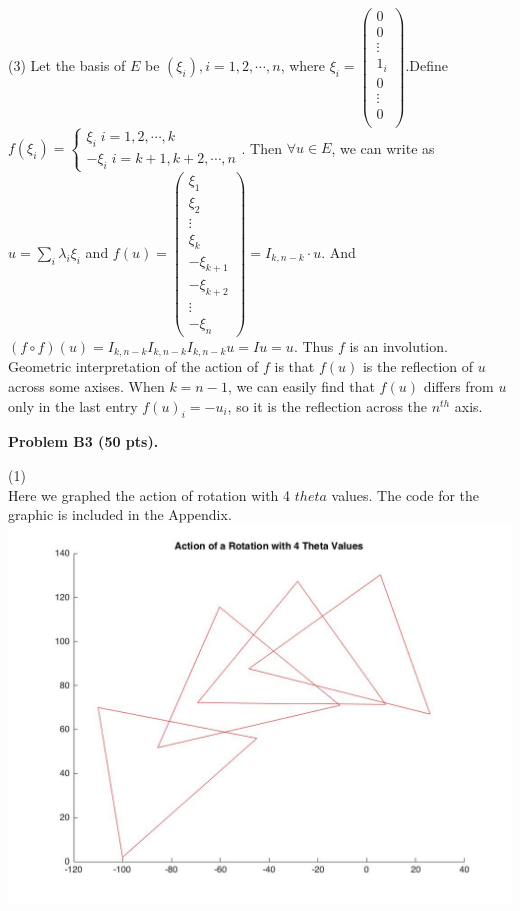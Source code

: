 \documentclass[12pt]{article}
\begin{document}
\medskip
(3)
Let the basis of $E$ be $(\xi_i), i = 1, 2, \cdots, n$, where $\xi_i = 
\begin{pmatrix}
0 \\
0 \\
\vdots \\
1_i \\
0 \\
\vdots \\
0 \\
\end{pmatrix}
$.Define \\
$
f(\xi_i) = \left \{
				\begin{array}{ll}
				\xi_i \; i = 1,2,\cdots,k \\
				-\xi_i \; i = k+1, k+2, \cdots, n				
				\end{array}
			\right.
$. Then $\forall u \in E$, we can write as $u = \sum_i \lambda_i \xi_i$ and $f(u) = 
\begin{pmatrix}
\xi_1 \\
\xi_2 \\
\vdots \\
\xi_k \\
-\xi_{k+1} \\
-\xi_{k+2} \\
\vdots \\
-\xi_n
\end{pmatrix} 
= I_{k , n - k} \cdot u
$. 
And $
(f \circ f)(u) = I_{k , n - k}I_{k , n - k}  I_{k , n - k}  u = I u = u
$. Thus $f$ is an involution.\\
Geometric interpretation of the action of $f$ is that $f(u)$ is the reflection of $u$ across some axises. When $k = n - 1$, we can easily find that $f(u)$ differs from $u$ only in the last entry $f(u)_i = -u_i$, so it is the reflection across the $n^{th}$ axis.

\vspace {0.5cm}\noindent
{\bf Problem B3 (50 pts).}


\medskip
(1)\\
Here we graphed the action of rotation with 4 $theta$ values. The code for the graphic is included in the Appendix. 
\includegraphics[scale=.25]{RotationPlot}
\end{document}
